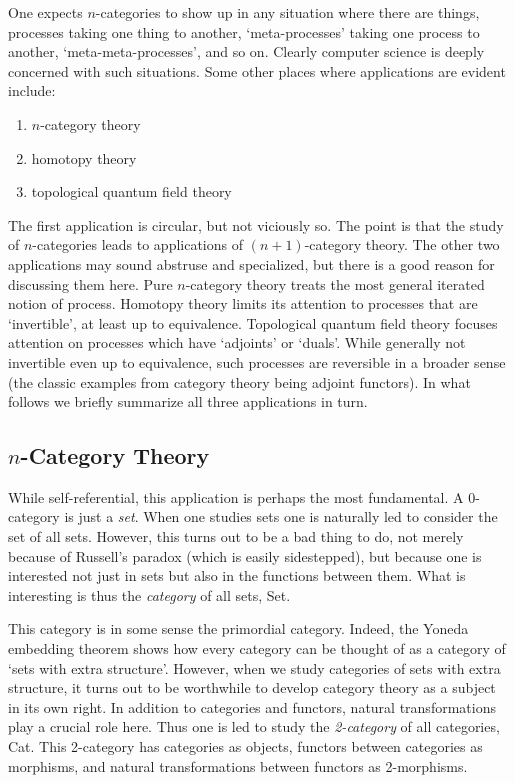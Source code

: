 One expects $n$-categories to show up in any situation where there are
things, processes taking one thing to another, `meta-processes' taking
one process to another, `meta-meta-processes', and so on.  Clearly
computer science is deeply concerned with such situations.
Some other places where applications are evident include:
\begin{enumerate} 
\item $n$-category theory 
\item homotopy theory 
\item topological quantum field theory 
\end{enumerate} 
The first application is circular, but not viciously so.  The point is
that the study of $n$-categories leads to applications of
$(n+1)$-category theory.  The other two applications may sound abstruse
and specialized, but there is a good reason for discussing them here.
Pure $n$-category theory treats the most general iterated notion of
process.  Homotopy theory limits its attention to processes that are
`invertible', at least up to equivalence.  Topological quantum field
theory focuses attention on processes which have `adjoints' or `duals'.
While generally not invertible even up to equivalence, such processes
are reversible in a broader sense (the classic examples from category
theory being adjoint functors).  In what follows we briefly summarize
all three applications in turn.

\subsection{$n$-Category Theory}

While self-referential, this application is perhaps the most
fundamental.  A 0-category is just a {\it set}.  When one studies sets
one is naturally led to consider the set of all sets.  However, this
turns out to be a bad thing to do, not merely because of Russell's
paradox (which is easily sidestepped), but because one is interested not
just in sets but also in the functions between them.  What is
interesting is thus the {\it category} of all sets, Set.

This category is in some sense the primordial category.  Indeed, the
Yoneda embedding theorem shows how every category can be thought of as a
category of `sets with extra structure'.  However, when we study
categories of sets with extra structure, it turns out to be worthwhile
to develop category theory as a subject in its own right.  In addition
to categories and functors, natural transformations play a crucial role
here.  Thus one is led to study the {\it 2-category} of all categories,
Cat.  This 2-category has categories as objects, functors between
categories as morphisms, and natural transformations between functors as
2-morphisms.

